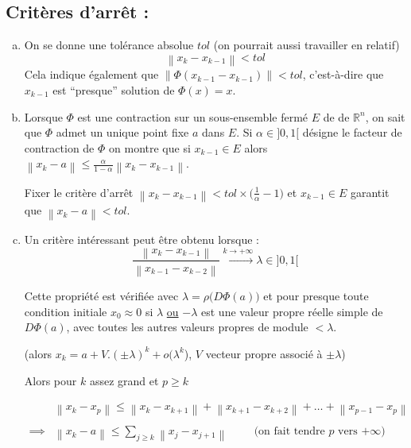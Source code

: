 \documentclass[a4paper,11pt]{article}
\newcommand{\R}{\mathbb{R}}
\newcommand{\norm}[1]{\left\lVert#1\right\rVert}
\theoremstyle{plain} %
\begin{document}
\subsection*{Critères d'arrêt :}
\begin{enumerate}[a)]
    \item
        On se donne une tolérance absolue $tol$ (on pourrait aussi travailler en relatif)
        \[
              \norm{x_k - x_{k-1}} < tol
        \]
        Cela indique également que $\norm{\Phi(x_{k-1} - x_{k-1})} < tol$,
        c'est-à-dire que $x_{k-1}$ est ``presque'' solution de $\Phi(x) = x$.
        
    \item Lorsque $\Phi$ est une contraction sur un sous-ensemble fermé $E$ de
          de $\R^n$, on sait que $\Phi$ admet un unique point fixe $a$ dans $E$.
          Si $\alpha \in ]0,1[$ désigne le facteur de contraction de $\Phi$ on
          montre que si $x_{k-1} \in E$ alors $\norm{x_k-a} \leq \frac{\alpha}{1-\alpha} \norm{x_k - x_{k-1}}$.
          
          Fixer le critère d'arrêt $\norm{x_k - x_{k-1}} < tol \times \big(\frac{1}{\alpha} - 1 \big)$ et $x_{k-1} \in E$ garantit que $\norm{x_k - a} < tol$.


    \item Un critère intéressant peut être obtenu lorsque :
        \[
        \frac{\norm{x_k - x_{k-1}}}{\norm{x_{k-1}-x_{k-2}}} \xrightarrow{k\to+\infty} \lambda \in ]0,1[ 
        \]

        Cette propriété est vérifiée avec $\lambda = \rho \big(D\Phi(a) \big)$ et pour
        presque toute condition initiale $x_0 \approx 0$ si $\lambda$ \underline{ou} $-\lambda$
        est une valeur propre réelle simple de $D\Phi(a)$, avec toutes les autres
        valeurs propres de module $< \lambda$.

        (alors $x_k = a + V.(\pm \lambda)^k + o(\lambda^k$), $V$ vecteur propre
        associé à $\pm \lambda$)

        Alors pour $k$ assez grand et $p \geq k$

        \begin{align*}
            & \norm{x_k - x_p} \leq \norm{x_k - x_{k+1}} + \norm{x_{k+1} - x_{k+2}}
            + \dots + \norm{x_{p-1}-x_p} \\ 
            \\
            \implies & \norm{x_k - a} \leq \sum_{j \geq k} \norm{x_j - x_{j+1}} \hspace{1cm} \text{(on fait tendre $p$ vers $+\infty$)}
        \end{align*}
        

\end{enumerate}
\end{document}

